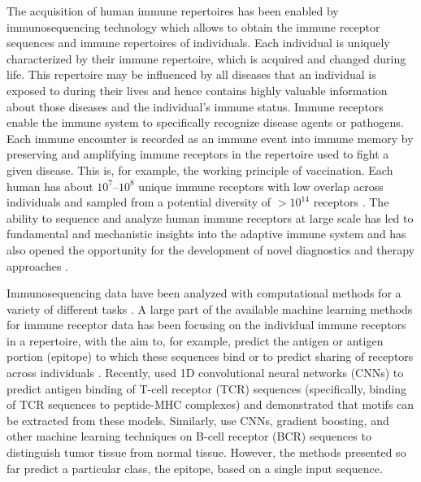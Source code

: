 \documentclass[oneside]{book}
\begin{document}
The acquisition of human immune repertoires has been enabled 
by immunosequencing technology \citep{georgiou2014promise, brown2019augmenting}
which allows to obtain the immune receptor sequences and immune repertoires
of individuals. Each individual is uniquely characterized by their immune repertoire, which
is acquired and changed during life. This repertoire may be influenced by
all diseases that an individual is exposed to during their lives and hence
contains highly valuable information about those diseases and the individual's immune status. 
Immune receptors enable the immune system to specifically recognize disease agents or pathogens. 
Each immune encounter is recorded as an immune event into immune memory by preserving and
amplifying immune receptors in the repertoire used to fight a given disease. 
This is, for example, the working principle of vaccination.
Each human has about $10^7$--$10^8$ unique immune receptors with low overlap
across individuals and sampled from a potential diversity of $>10^{14}$ 
receptors \citep{mora2019howmanyifferentclonotypes}. 
The ability to sequence and analyze human immune receptors at large scale 
has led to fundamental and mechanistic insights into the adaptive immune 
system and has also opened the opportunity for the development of novel 
diagnostics and therapy approaches \citep{georgiou2014promise, brown2019augmenting}.
%

Immunosequencing data have been analyzed with computational 
methods for a variety
of different tasks \citep{greiff2015bioinformatic,shugay2015vdjtools,miho2018computational,yaari2015practical, wardemann2017novel}. 
%
A large part of the available machine learning methods for immune 
receptor data has been focusing on the individual 
immune receptors in a repertoire, with the aim to, for example, predict the antigen 
or antigen portion (epitope) to which these sequences
bind or to predict sharing of receptors across individuals \citep{gielis2019tcrex,springer2020tcrpeptidebinding,jurtz2018nettcr,moris2019treating, fischer2019predicting, greiff2017learning, sidhom2019deeptcr,elhanati2018predicting}.
Recently, \citet{jurtz2018nettcr} used 1D convolutional 
neural networks (CNNs) to predict antigen binding of T-cell receptor (TCR) sequences 
(specifically, binding of TCR sequences to peptide-MHC complexes) 
and demonstrated that motifs can be extracted
from these models. 
%
Similarly, \citet{konishi2019capturing} use CNNs, gradient boosting, 
and other machine learning techniques on B-cell receptor (BCR) sequences to distinguish
tumor tissue from normal tissue.
However, the methods presented so far predict a particular class, 
the epitope, based on a single input sequence.
\end{document}
